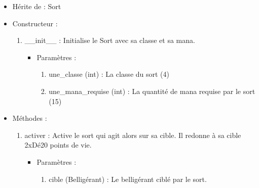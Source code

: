 \documentclass[12pt,pdftex,oneside]{article}
\begin{document}
  \begin{itemize}
  \item Hérite de : Sort


  \item Constructeur : 

  \begin{enumerate}
  \item \_\_init\_\_ : Initialise le Sort avec sa classe et sa mana.
    \begin{itemize}
    \item Paramètres : 
      \begin{enumerate}
      \item une\_classe (int) : La classe du sort (4)
      \item une\_mana\_requise (int) : La quantité de mana requise par le sort (15)
      \end{enumerate}
    \end{itemize}

  \end{enumerate}

  \item Méthodes : 

    \begin{enumerate}
    \item activer : Active le sort qui agit alors sur sa cible. Il redonne à sa
      cible 2xDé20 points de vie.
      \begin{itemize}
      \item Paramètres : 
        \begin{enumerate}
        \item cible (Belligérant) : Le belligérant ciblé par le sort.
        \end{enumerate}
      \end{itemize}
    \end{enumerate}

  \end{itemize}
\end{document}
